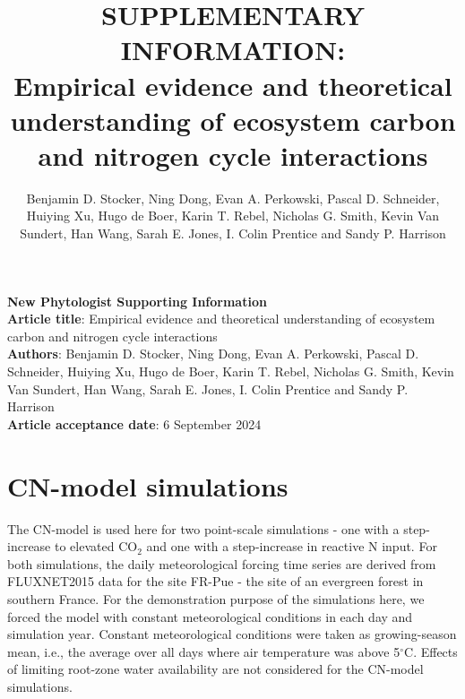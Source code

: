 \documentclass{myreport}
\begin{document}
\pagestyle{headings}

\renewcommand{\thefigure}{\arabic{figure}}
\renewcommand{\thetable}{\arabic{table}}
\renewcommand{\thesection}{Notes S\arabic{section}}
\renewcommand{\theequation}{\arabic{equation}}

\setcounter{section}{3}

% 

\title{SUPPLEMENTARY INFORMATION:\\
Empirical evidence and theoretical understanding of ecosystem carbon and nitrogen cycle interactions}
\author{Benjamin D. Stocker, Ning Dong, Evan A. Perkowski, Pascal D. Schneider,
Huiying Xu, Hugo de Boer, Karin T. Rebel, Nicholas G. Smith, Kevin Van Sundert, Han Wang, Sarah E. Jones, I. Colin Prentice and Sandy P. Harrison} 

{\selectfont
\noindent \textbf{New Phytologist Supporting Information} \\
\textbf{Article title}: Empirical evidence and theoretical understanding of ecosystem carbon and nitrogen cycle interactions\\
\textbf{Authors}: Benjamin D. Stocker, Ning Dong, Evan A. Perkowski, Pascal D. Schneider,
Huiying Xu, Hugo de Boer, Karin T. Rebel, Nicholas G. Smith, Kevin Van Sundert, Han Wang, Sarah E. Jones, I. Colin Prentice and Sandy P. Harrison\\
\textbf{Article acceptance date}: 6 September 2024 \\
}

\section{CN-model simulations}

The CN-model is used here for two point-scale simulations - one with a step-increase to elevated CO$_2$ and one with a step-increase in reactive N input. For both simulations, the daily meteorological forcing time series are derived from FLUXNET2015 data for the site FR-Pue \citep{rambal_growth_2004} - the site of an evergreen forest in southern France. For the demonstration purpose of the simulations here, we forced the model with constant meteorological conditions in each day and simulation year. Constant meteorological conditions were taken as growing-season mean, i.e., the average over all days where air temperature was above 5$^\circ$C. Effects of limiting root-zone water availability are not considered for the CN-model simulations. 
\end{document}

